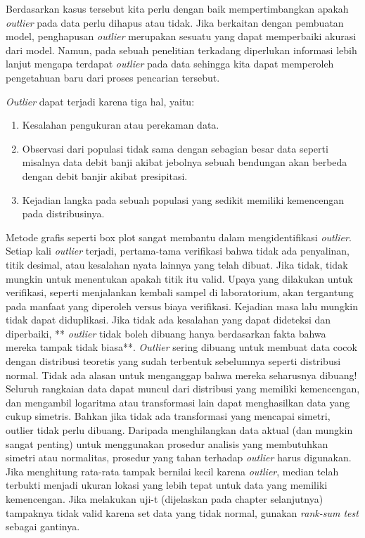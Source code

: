 \documentclass[]{book}
\providecommand{\tightlist}{%
  \setlength{\itemsep}{0pt}\setlength{\parskip}{0pt}}
\begin{document}
Berdasarkan kasus tersebut kita perlu dengan baik mempertimbangkan
apakah \emph{outlier} pada data perlu dihapus atau tidak. Jika berkaitan
dengan pembuatan model, penghapusan \emph{outlier} merupakan sesuatu
yang dapat memperbaiki akurasi dari model. Namun, pada sebuah penelitian
terkadang diperlukan informasi lebih lanjut mengapa terdapat
\emph{outlier} pada data sehingga kita dapat memperoleh pengetahuan baru
dari proses pencarian tersebut.

\emph{Outlier} dapat terjadi karena tiga hal, yaitu:

\begin{enumerate}
\def\labelenumi{\arabic{enumi}.}
\tightlist
\item
  Kesalahan pengukuran atau perekaman data.
\item
  Observasi dari populasi tidak sama dengan sebagian besar data seperti
  misalnya data debit banji akibat jebolnya sebuah bendungan akan
  berbeda dengan debit banjir akibat presipitasi.
\item
  Kejadian langka pada sebuah populasi yang sedikit memiliki kemencengan
  pada distribusinya.
\end{enumerate}

Metode grafis seperti box plot sangat membantu dalam mengidentifikasi
\emph{outlier}. Setiap kali \emph{outlier} terjadi, pertama-tama
verifikasi bahwa tidak ada penyalinan, titik desimal, atau kesalahan
nyata lainnya yang telah dibuat. Jika tidak, tidak mungkin untuk
menentukan apakah titik itu valid. Upaya yang dilakukan untuk
verifikasi, seperti menjalankan kembali sampel di laboratorium, akan
tergantung pada manfaat yang diperoleh versus biaya verifikasi. Kejadian
masa lalu mungkin tidak dapat diduplikasi. Jika tidak ada kesalahan yang
dapat dideteksi dan diperbaiki, ** \emph{outlier} tidak boleh dibuang
hanya berdasarkan fakta bahwa mereka tampak tidak biasa**.
\emph{Outlier} sering dibuang untuk membuat data cocok dengan distribusi
teoretis yang sudah terbentuk sebelumnya seperti distribusi normal.
Tidak ada alasan untuk menganggap bahwa mereka seharusnya dibuang!
Seluruh rangkaian data dapat muncul dari distribusi yang memiliki
kemencengan, dan mengambil logaritma atau transformasi lain dapat
menghasilkan data yang cukup simetris. Bahkan jika tidak ada
transformasi yang mencapai simetri, outlier tidak perlu dibuang.
Daripada menghilangkan data aktual (dan mungkin sangat penting) untuk
menggunakan prosedur analisis yang membutuhkan simetri atau normalitas,
prosedur yang tahan terhadap \emph{outlier} harus digunakan. Jika
menghitung rata-rata tampak bernilai kecil karena \emph{outlier}, median
telah terbukti menjadi ukuran lokasi yang lebih tepat untuk data yang
memiliki kemencengan. Jika melakukan uji-t (dijelaskan pada chapter
selanjutnya) tampaknya tidak valid karena set data yang tidak normal,
gunakan \emph{rank-sum test} sebagai gantinya.
\end{document}

